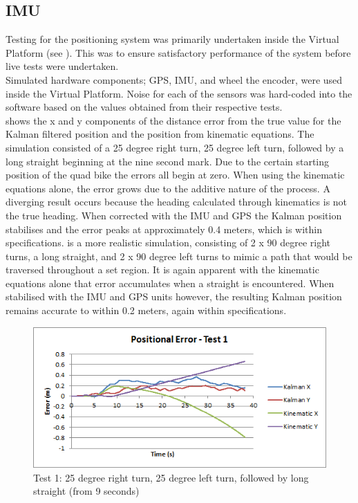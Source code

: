 \documentclass[main.tex]{subfiles}
\begin{document}
\subsection{IMU}
Testing for the positioning system was primarily undertaken inside the Virtual Platform (see ). This was to ensure satisfactory performance of the system before live tests were undertaken.\\
Simulated hardware components; GPS, IMU, and wheel the encoder, were used inside the Virtual Platform. Noise for each of the sensors was hard-coded into the software based on the values obtained from their respective tests.\\
 shows the x and y components of the distance error from the true value for the Kalman filtered position and the position from kinematic equations. The simulation consisted of a 25 degree right turn, 25 degree left turn, followed by a long straight beginning at the nine second mark. Due to the certain starting position of the quad bike the errors all begin at zero. When using the kinematic equations alone, the error grows due to the additive nature of the process. A diverging result occurs because the heading calculated through kinematics is not the true heading. When corrected with the IMU and GPS the Kalman position stabilises and the error peaks at approximately 0.4 meters, which is within specifications.  is a more realistic simulation, consisting of 2 x 90 degree right turns, a long straight, and 2 x 90 degree left turns to mimic a path that would be traversed throughout a set region. It is again apparent with the kinematic equations alone that error accumulates when a straight is encountered. When stabilised with the IMU and GPS units however, the resulting Kalman position remains accurate to within 0.2 meters, again within specifications.
\begin{figure}[ht]
\includegraphics[width=\textwidth]{5-Testing/position_error_test_1.png}
\centering
\caption{Test 1: 25 degree right turn, 25 degree left turn, followed by long straight (from 9 seconds)}
\end{figure}
\end{document}
